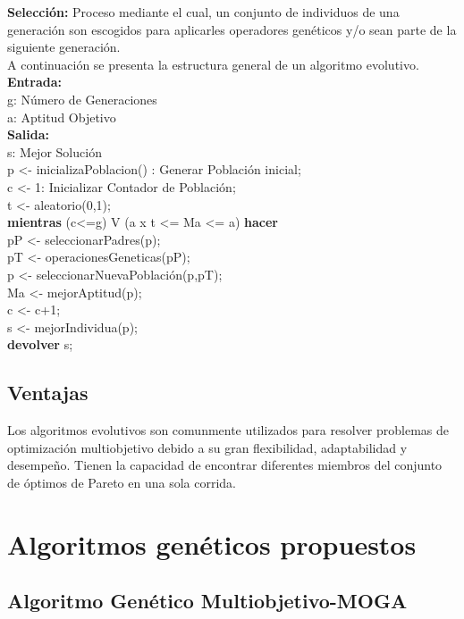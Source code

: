 		\textbf{Selección:} Proceso mediante el cual, un conjunto de individuos de una generación son escogidos para aplicarles operadores genéticos y/o sean parte de la siguiente generación. \\

		A continuación se presenta la estructura general de un algoritmo evolutivo.\\

		\textbf{Entrada:}\\
		g: Número de Generaciones\\
		a: Aptitud Objetivo\\
		\textbf{Salida:}\\
		s: Mejor Solución\\

		p <- inicializaPoblacion() : Generar Población inicial;\\
		c <- 1: Inicializar Contador de Población;\\
		t <- aleatorio(0,1);\\
		\textbf{mientras} (c<=g) V (a x t <= Ma <= a) \textbf{hacer}\\
			pP <- seleccionarPadres(p);\\
			pT <- operacionesGeneticas(pP);\\
			p <- seleccionarNuevaPoblación(p,pT);\\
			Ma <- mejorAptitud(p);\\
			c <- c+1;\\
		s <- mejorIndividua(p);\\
		\textbf{devolver} s;	\\

		\subsection{Ventajas}
		Los algoritmos evolutivos son comunmente utilizados para resolver problemas de optimización multiobjetivo debido a su gran flexibilidad, adaptabilidad y desempeño. Tienen la capacidad de encontrar diferentes miembros del conjunto de óptimos de Pareto en una sola corrida.

	\section{Algoritmos genéticos propuestos}

		\subsection{Algoritmo Genético Multiobjetivo-MOGA}

